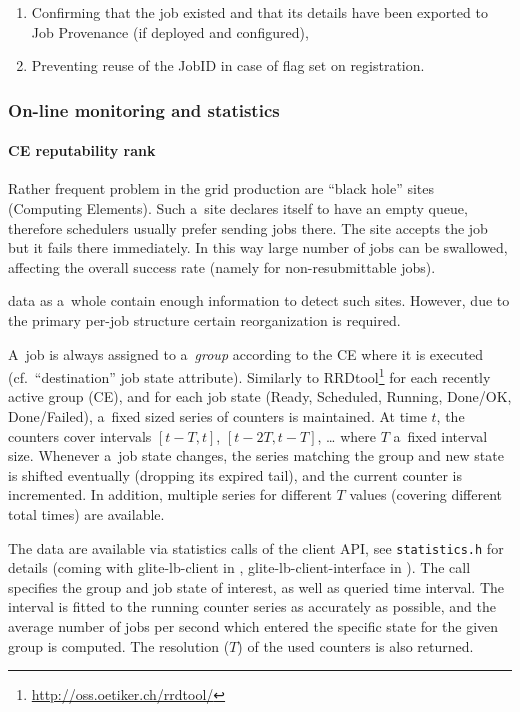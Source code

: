 \begin{enumerate}
\item Confirming that the job existed and that its details have been exported to Job Provenance (if deployed and configured),
\item Preventing reuse of the JobID in case of flag  set on registration.
\end{enumerate}

\subsubsection{On-line monitoring and statistics}
\label{maintain:statistics}

\paragraph{CE reputability rank}

Rather frequent problem in the grid production are ``black hole'' sites (Computing Elements).
Such a~site declares itself to have an empty queue, therefore schedulers usually prefer sending
jobs there. The site accepts the job but it fails there immediately.
In this way large number of jobs can be swallowed, affecting the overall success rate
(namely for non-resubmittable jobs).

\LB data as a~whole contain enough information to detect such sites.
However, due to the primary per-job structure certain reorganization is required.

A~job is always assigned to a~\emph{group} according to
the CE where it is executed (cf.\ ``destination'' job state attribute).
Similarly to RRDtool\footnote{\url{http://oss.oetiker.ch/rrdtool/}}
for each recently active group (CE),
and for each job state (Ready, Scheduled, Running, Done/OK, Done/Failed),
a~fixed sized series of counters is maintained.
At time $t$, the counters cover intervals $[t-T,t]$, $[t-2T,t-T]$, \dots
where $T$ a~fixed interval size.
Whenever a~job state changes, the series matching the group and new state
is shifted eventually (dropping its expired tail), and the current counter
is incremented.
In addition, multiple series for different $T$ values (\ie covering different
total times) are available. 

The data are available via statistics calls of the client API,
see \verb'statistics.h' for details (coming with glite-lb-client in ,
glite-lb-client-interface in ).
The call specifies the group and job state of interest, as well as queried
time interval.
The interval is fitted to the running counter series as accurately as possible,
and the average number of jobs per second which entered the specific state for
the given group is computed.  The resolution ($T$) of the used counters is also
returned.

